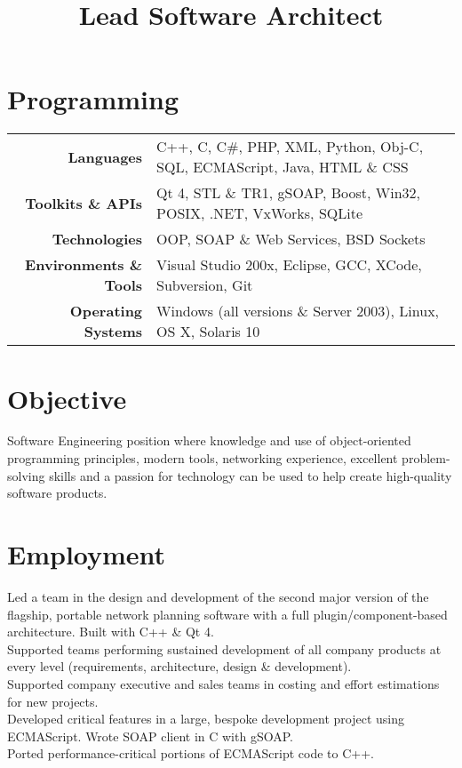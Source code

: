 \documentclass{resume}
\begin{document}
\address{89 Barley Leaze\\Chippenham\\SN14 6GW\\UK}
\address{lee@leegent.net\\+44 7748 183797}

\begin{resume}

\section{Programming}
{\small
\begin{tabular}{rl}
\textbf{Languages} & C++, C, C\#, PHP, XML, Python, Obj-C, SQL, ECMAScript, Java, HTML \& CSS \\
\textbf{Toolkits \& APIs} & Qt 4, STL \& TR1, gSOAP, Boost, Win32, POSIX, .NET, VxWorks, SQLite \\
\textbf{Technologies} & OOP, SOAP \& Web Services, BSD Sockets \\
\textbf{Environments \& Tools} & Visual Studio 200x, Eclipse, GCC, XCode, Subversion, Git \\
\textbf{Operating Systems} & Windows (all versions \& Server 2003), Linux, OS X, Solaris 10
\end{tabular}
}
\section{Objective}
Software Engineering position where knowledge and use of object-oriented programming principles, modern tools, networking experience, excellent problem-solving skills and a passion for technology can be used to help create high-quality software products.

\section{Employment}

\title{\bf{Lead Software Architect}}
\begin{position}
Led a team in the design and development of the second major version of the flagship, portable network planning software with a full plugin/component-based architecture.  Built with C++ \& Qt 4.\vspace{1mm}\\
Supported teams performing sustained development of all company products at every level (requirements, architecture, design \& development).\vspace{1mm}\\
Supported company executive and sales teams in costing and effort estimations for new projects.\vspace{1mm}\\
Developed critical features in a large, bespoke development project using ECMAScript.  Wrote SOAP client in C with gSOAP.\vspace{1mm}\\
Ported performance-critical portions of ECMAScript code to C++.
\end{position}


\end{resume}
\end{document}
